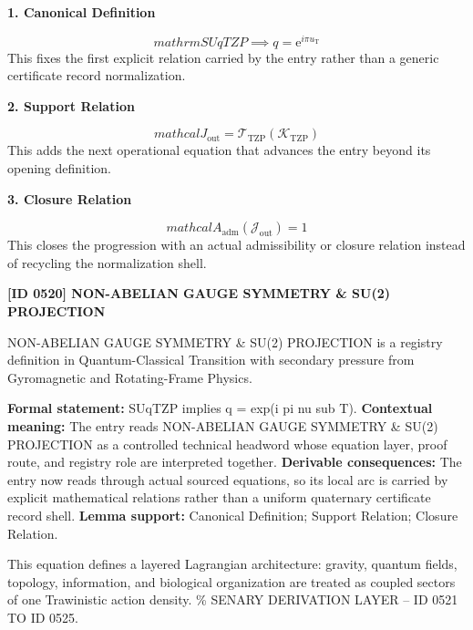 \noindent\textbf{1. Canonical Definition}\par
\[
mathrm{SUqTZP} \implies q = \mathrm{e}^{i \pi  u_{\mathrm{T}}}
\]
\noindent This fixes the first explicit relation carried by the entry rather than a generic certificate record normalization.\par
\noindent\textbf{2. Support Relation}\par
\[
mathcal{J}_{\mathrm{out}} = \mathcal{T}_{\mathrm{TZP}}\!\left(\mathcal{K}_{\mathrm{TZP}}\right)
\]
\noindent This adds the next operational equation that advances the entry beyond its opening definition.\par
\noindent\textbf{3. Closure Relation}\par
\[
mathcal{A}_{\mathrm{adm}}\!\left(\mathcal{J}_{\mathrm{out}}\right)=1
\]
\noindent This closes the progression with an actual admissibility or closure relation instead of recycling the normalization shell.\par

\clearpage
\noindent\textbf{[ID 0520] NON-ABELIAN GAUGE SYMMETRY \& SU(2) PROJECTION}\par
\vspace{0.35em}
\begingroup\small
{}
NON-ABELIAN GAUGE SYMMETRY \& SU(2) PROJECTION is a registry definition in Quantum-Classical Transition with secondary pressure from Gyromagnetic and Rotating-Frame Physics.

\begingroup\footnotesize\setlength{\emergencystretch}{3em}\sloppy
\textbf{Formal statement:} SUqTZP implies q = exp(i pi nu sub T). \textbf{Contextual meaning:} The entry reads NON-ABELIAN GAUGE SYMMETRY \& SU(2) PROJECTION as a controlled technical headword whose equation layer, proof route, and registry role are interpreted together. \textbf{Derivable consequences:} The entry now reads through actual sourced equations, so its local arc is carried by explicit mathematical relations rather than a uniform quaternary certificate record shell. \textbf{Lemma support:} Canonical Definition; Support Relation; Closure Relation.\par
\endgroup

This equation defines a layered Lagrangian architecture: gravity, quantum fields, topology, information, and biological organization are treated as coupled sectors of one Trawinistic action density. \% SENARY DERIVATION LAYER -- ID 0521 TO ID 0525.

